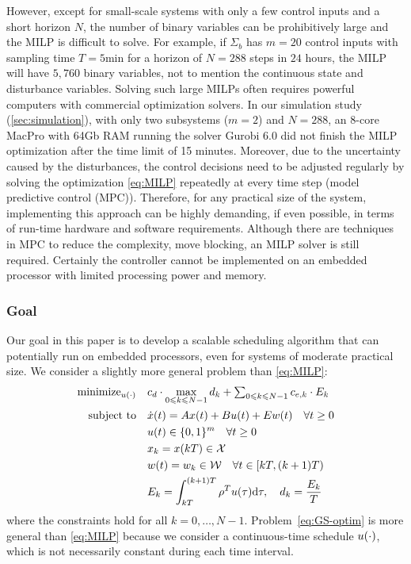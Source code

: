 However, except for small-scale systems with only a few control inputs and a short horizon $N$, the number of binary variables can be prohibitively large and the MILP is difficult to solve.
For example, if $\Sigma_b$ has %
$m=20$ control inputs with sampling time $T = 5 \text{min}$ for a horizon of $N = 288$ steps in $24$ hours, the MILP will have $5 \comma 760$ binary variables, not to mention the continuous state and disturbance variables.
Solving such large MILPs often requires powerful computers with commercial optimization
solvers.
In our simulation study (\cref{sec:simulation}), with only two subsystems ($m=2$) and $N=288$, an 8-core MacPro with 64Gb RAM running the %
solver Gurobi 6.0 did not finish the MILP optimization after the time limit of 15 minutes.
Moreover, due to the uncertainty caused by the disturbances, the control decisions need to be adjusted regularly by solving the optimization \eqref{eq:MILP} repeatedly at every time step (model predictive control (MPC)).
Therefore, for any practical size of the system, implementing this approach can be highly demanding, if even possible, in terms of run-time hardware and software requirements.
Although there are techniques in MPC to reduce the complexity, \eg move blocking, an MILP solver is still required.
Certainly the controller cannot be implemented on an embedded processor with limited processing power and memory.

\subsubsection{Goal}

Our goal in this paper is to develop a scalable %
scheduling algorithm that can potentially run on embedded processors, even for systems of moderate practical size.
We consider a slightly more general problem than \eqref{eq:MILP}:
\begin{align}
  \operatorname{minimize}_{u (\cdot)} \quad & c_d \cdot \max_{0 \leqslant k \leqslant
  N - 1} d_k + \textstyle\sum_{0 \leqslant k \leqslant N - 1} c_{e, k} \cdot E_k 
  \label{eq:GS-optim}\\
  \text{subject to} \quad
  & \dot{x} (t) = Ax (t) + Bu (t) + Ew (t) \quad \forall t \geq 0 \nonumber\\
  & u(t) \in \{0,1\}^{m} \quad \forall t \geq 0 \nonumber\\
  & x_{k} = x (kT) \in \mathcal{X} \nonumber\\
  & w (t) = w_{k} \in \mathcal{W} \quad \forall t \in [kT, (k + 1) T) \nonumber\\
  & E_k = \int_{kT}^{(k + 1) T} \rho^{T} u(\tau) \mathrm{d} \tau, \quad d_k = \frac{E_k}{T} \nonumber
\end{align}
where the constraints hold for all $k = 0, \ldots, N - 1$.
Problem~\eqref{eq:GS-optim} is more general than \eqref{eq:MILP} because we consider a
continuous-time schedule $u (\cdot)$, which is not necessarily constant
during each time interval.



